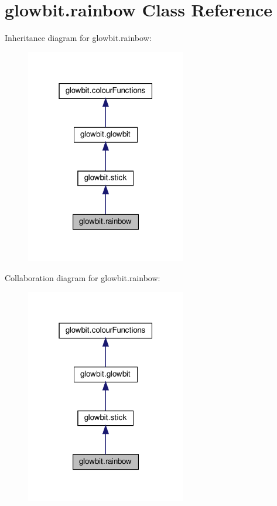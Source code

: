 \hypertarget{classglowbit_1_1rainbow}{}\section{glowbit.\+rainbow Class Reference}
\label{classglowbit_1_1rainbow}


Inheritance diagram for glowbit.\+rainbow\+:\nopagebreak
\begin{figure}[H]
\begin{center}
\leavevmode
\includegraphics[width=199pt]{classglowbit_1_1rainbow__inherit__graph}
\end{center}
\end{figure}


Collaboration diagram for glowbit.\+rainbow\+:\nopagebreak
\begin{figure}[H]
\begin{center}
\leavevmode
\includegraphics[width=199pt]{classglowbit_1_1rainbow__coll__graph}
\end{center}
\end{figure}
